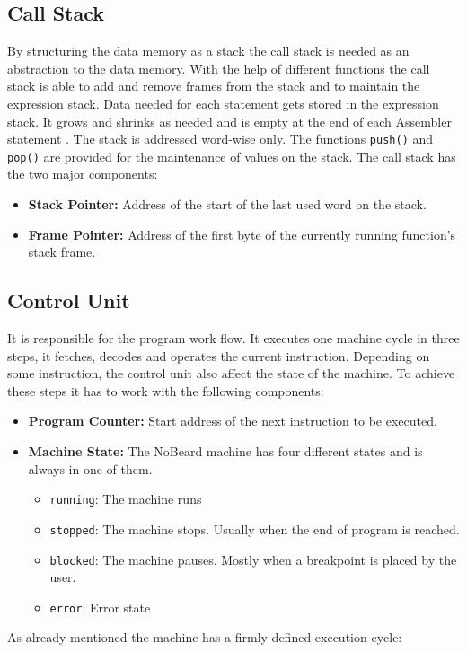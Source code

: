 \subsection{Call Stack}
By structuring the data memory as a stack the call stack is needed as an abstraction to the data memory. With the help of different functions the call stack is able to add and remove frames from the stack and to maintain the expression stack. Data needed for each statement gets stored in the expression stack. It grows and shrinks as needed and is empty at the end of each Assembler statement . The stack is addressed word-wise only.  The functions \lstinline$push()$ and \lstinline$pop()$ are provided for the maintenance of values on the stack. The call stack has the two major components:

\begin{itemize}
\item \textbf{Stack Pointer: }Address of the start of the last used word on the stack. 
\item \textbf{Frame Pointer: }Address of the first byte of the currently running function's stack frame. 
\end{itemize}

\subsection{Control Unit}
It is responsible for the program work flow. It executes one machine cycle in three steps, it fetches, decodes and operates the current instruction. Depending on some instruction, the control unit also affect the state of the machine. To achieve these steps it has to work with the following components:

\begin{itemize}
\item \textbf{Program Counter: }Start address of the next instruction to be executed.
\item \textbf{Machine State: }The NoBeard machine has four different states and is always in one of them. 
	\begin{itemize}
		\item \lstinline$running$: The machine runs
		\item \lstinline$stopped$: The machine stops. Usually when the end of program is reached.
		\item \lstinline$blocked$: The machine pauses. Mostly when a breakpoint is placed by the user.
		\item \lstinline$error$: Error state
	\end{itemize}
\end{itemize}
As already mentioned the machine has a firmly defined execution cycle:

